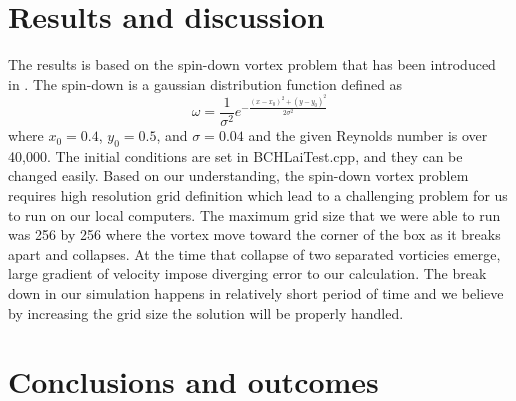 \documentclass{article}
\begin{document}
\section{Results and discussion}

The results is based on the spin-down vortex problem that has been introduced in \cite{howel1997}. The spin-down is a gaussian distribution function defined as 
\begin{equation}
	\omega = \frac{1}{\sigma^2} e^{-\frac{(x-x_0)^2+(y-y_0)^2}{2 \sigma^2}}
\end{equation}
where $x_0 = 0.4$, $y_0 = 0.5$, and $\sigma = 0.04$ and the given Reynolds number is over 40,000. The initial conditions are set in BCHLaiTest.cpp, and they can be changed easily. Based on our understanding, the spin-down vortex problem requires high resolution grid definition which lead to a challenging problem for us to run on our local computers. The maximum grid size that we were able to run was 256 by 256 where the vortex move toward the corner of the box as it breaks apart and collapses. At the time that collapse of two separated vorticies emerge, large gradient of velocity impose diverging error to our calculation. The break down in our simulation happens in relatively short period of time and we believe by increasing the grid size the solution will be properly handled.

\section{Conclusions and outcomes}



\end{document}
